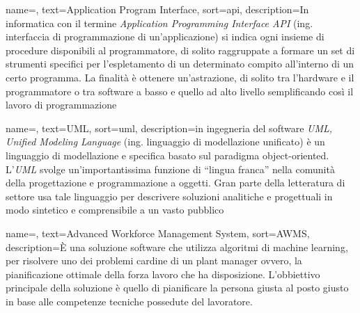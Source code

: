 
\renewcommand{\acronymname}{Acronimi e abbreviazioni}

    


\renewcommand{\glossaryname}{Glossario}

{
    name=,
    text=Application Program Interface,
    sort=api,
    description={In informatica con il termine \emph{Application Programming Interface API} (ing. interfaccia di programmazione di un'applicazione) si indica ogni insieme di procedure disponibili al programmatore, di solito raggruppate a formare un set di strumenti specifici per l'espletamento di un determinato compito all'interno di un certo programma. La finalità è ottenere un'astrazione, di solito tra l'hardware e il programmatore o tra software a basso e quello ad alto livello semplificando così il lavoro di programmazione}
}

{
    name=,
    text=UML,
    sort=uml,
    description={in ingegneria del software \emph{UML, Unified Modeling Language} (ing. linguaggio di modellazione unificato) è un linguaggio di modellazione e specifica basato sul paradigma object-oriented. L'\emph{UML} svolge un'importantissima funzione di ``lingua franca'' nella comunità della progettazione e programmazione a oggetti. Gran parte della letteratura di settore usa tale linguaggio per descrivere soluzioni analitiche e progettuali in modo sintetico e comprensibile a un vasto pubblico}
}

{
	name=,
	text=Advanced Workforce Management System,
	sort=AWMS,
	description={È una soluzione software che utilizza algoritmi di \gls{machine learning}, per risolvere uno dei problemi cardine di un \gls{plant manager} ovvero, la pianificazione ottimale della forza lavoro che ha disposizione. L'obbiettivo principale della soluzione è quello di pianificare la persona giusta al posto giusto in base alle competenze tecniche possedute del lavoratore.}
}

